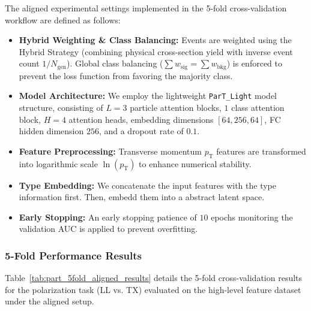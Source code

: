 \documentclass[12pt]{article}
\begin{document}
			The aligned experimental settings implemented in the 5-fold cross-validation workflow are defined as follows:
			\begin{itemize}
				\item \textbf{Hybrid Weighting \& Class Balancing:} Events are weighted using the Hybrid Strategy (combining physical cross-section yield with inverse event count $1/N_{\text{gen}}$). Global class balancing ($\sum w_{\text{sig}} = \sum w_{\text{bkg}}$) is enforced to prevent the loss function from favoring the majority class.

				\item \textbf{Model Architecture:} We employ the lightweight \texttt{ParT\_Light} model structure, consisting of $L=3$ particle attention blocks, $1$ class attention block, $H=4$ attention heads, embedding dimensions $[64, 256, 64]$, FC hidden dimension $256$, and a dropout rate of $0.1$.

				\item \textbf{Feature Preprocessing:} Transverse momentum $p_{\text{T}}$ features are transformed into logarithmic scale $\ln(p_{\text{T}})$ to enhance numerical stability.

                \item \textbf{Type Embedding:} We concatenate the input features with the type information first. Then, embedd them into a abstract latent space.

				\item \textbf{Early Stopping:} An early stopping patience of $10$ epochs monitoring the validation AUC is applied to prevent overfitting.
			\end{itemize}

		\subsubsection{5-Fold Performance Results}

			Table~\ref{tab:part_5fold_aligned_results} details the 5-fold cross-validation results for the polarization task (LL vs. TX) evaluated on the high-level feature dataset under the aligned setup.
\end{document}

